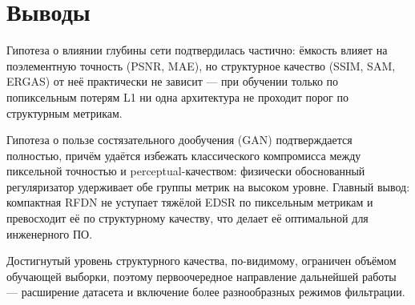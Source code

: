 \chapter{Выводы}
\label{chap:conclusion}

Гипотеза о влиянии глубины сети подтвердилась частично: ёмкость влияет на поэлементную точность (PSNR, MAE), но структурное качество (SSIM, SAM, ERGAS) от неё практически не зависит — при обучении только по попиксельным потерям L1 ни одна архитектура не проходит порог по структурным метрикам.

Гипотеза о пользе состязательного дообучения (GAN) подтверждается полностью, причём удаётся избежать классического компромисса между пиксельной точностью и perceptual-качеством: физически обоснованный регуляризатор удерживает обе группы метрик на высоком уровне. Главный вывод: компактная RFDN не уступает тяжёлой EDSR по пиксельным метрикам и превосходит её по структурному качеству, что делает её оптимальной для инженерного ПО.

Достигнутый уровень структурного качества, по-видимому, ограничен объёмом обучающей выборки, поэтому первоочередное направление дальнейшей работы — расширение датасета и включение более разнообразных режимов фильтрации.